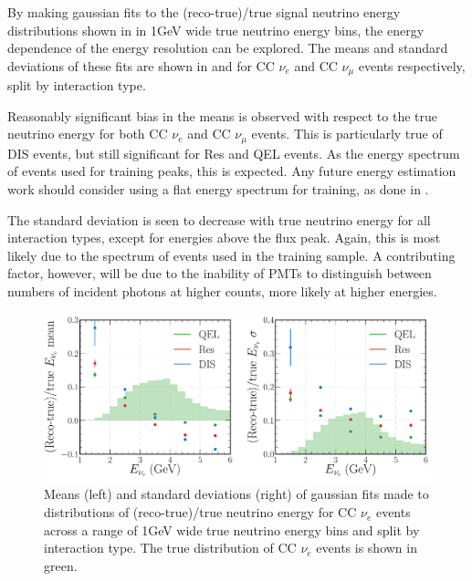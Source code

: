 By making gaussian fits to the (reco-true)/true signal neutrino energy distributions shown in
 in \unit{1}{GeV} wide true neutrino energy bins, the energy
dependence of the energy resolution can be explored. The means and standard deviations of these
fits are shown in  and  for CC
$\nu_{e}$ and CC $\nu_{\mu}$ events respectively, split by interaction type.

Reasonably significant bias in the means is observed with respect to the true neutrino energy for
both CC $\nu_{e}$ and CC $\nu_{\mu}$ events. This is particularly true of DIS events, but still
significant for Res and QEL events. As the energy spectrum of events used for training peaks, this
is expected. Any future energy estimation work should consider using a flat energy spectrum for
training, as done in .

The standard deviation is seen to decrease with true neutrino energy for all interaction types,
except for energies above the flux peak. Again, this is most likely due to the spectrum of events
used in the training sample. A contributing factor, however, will be due to the inability of PMTs
to distinguish between numbers of incident photons at higher counts, more likely at higher
energies.

\begin{figure} %
    \includegraphics[width=\textwidth]{diagrams/7-results/final_energy_nuel.pdf}
    \caption[Means and standard deviations of fits to $\nu_{e}$ energy distributions]
    {Means (left) and standard deviations (right) of gaussian fits made to distributions of
        (reco-true)/true neutrino energy for CC $\nu_{e}$ events across a range of \unit{1}{GeV}
        wide true neutrino energy bins and split by interaction type. The true distribution of CC
        $\nu_{e}$ events is shown in green.}
    \label{fig:final_energy_nuel}
\end{figure}

